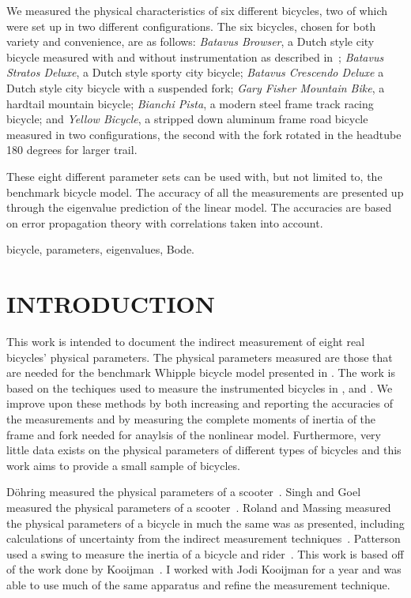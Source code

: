 \documentclass{bmd2010p}
\begin{document}
We measured the physical characteristics of six different bicycles, two of
which were set up in two different configurations. The six bicycles, chosen for
both variety and convenience, are as follows:
\emph{Batavus Browser}, a Dutch style city bicycle measured with and without
instrumentation as described in~\cite{Kooijman2009a}; \emph{Batavus Stratos
Deluxe}, a Dutch style sporty city bicycle; \emph{Batavus Crescendo Deluxe} a
Dutch style city bicycle with a suspended fork; \emph{Gary Fisher Mountain
Bike}, a hardtail mountain bicycle; \emph{Bianchi Pista}, a modern steel frame
track racing bicycle; and \emph{Yellow Bicycle}, a stripped down aluminum frame
road bicycle measured in two configurations, the second with the fork rotated
in the headtube 180 degrees for larger trail.

These eight different parameter sets can be used with, but not
limited to, the benchmark bicycle model. The accuracy of all the measurements
are presented up through the eigenvalue prediction of the linear model. The
accuracies are based on error propagation theory with correlations taken into
account.

\begin{keywords}
bicycle,
parameters,
eigenvalues,
Bode.
\end{keywords}

\section{INTRODUCTION}
This work is intended to document the indirect measurement of eight real
bicycles' physical parameters. The physical parameters measured are those that
are needed for the benchmark Whipple bicycle model presented in
\cite{Meijaard2007}. The work is based on the techiques used to measure the
instrumented bicycles in \cite{Kooijman2006}, \cite{Kooijman2008} and
\cite{Moore2009a}. We improve upon these methods by both increasing and reporting
the accuracies of the measurements and by measuring the complete moments of
inertia of the frame and fork needed for anaylsis of the nonlinear model.
Furthermore, very little data exists on the physical parameters of different
types of bicycles and this work aims to provide a small sample of bicycles.

D\"{o}hring measured the physical parameters of a scooter~\cite{Dohring1953}.
Singh and Goel measured the physical parameters of a scooter~\cite{Singh1971}.
Roland and Massing measured the physical parameters of a bicycle in much the
same was as presented, including calculations of uncertainty from the indirect
measurement techniques~\cite{Roland1971}. Patterson used a swing to measure the
inertia of a bicycle and rider~\cite{Patterson2004}. This work is based off of the work
done by Kooijman~\cite{Kooijman2006}. I worked with Jodi Kooijman for a year and
was able to use much of the same apparatus and refine the measurement
technique.
\end{document}
